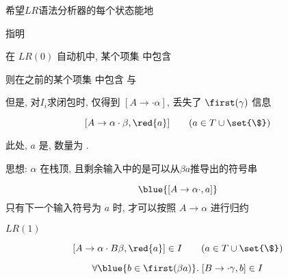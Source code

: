 \begin{frame}{}
  \begin{center}
    希望$LR$语法分析器的每个状态能地

    \vspace{0.30cm}
    指明

    \pause
    \vspace{1.00cm}
    在 $LR(0)$ 自动机中, 某个项集  中包含 

    \vspace{0.50cm}
    则在之前的某个项集  中包含 
    与 

    \vspace{0.50cm}

    \pause
    \vspace{0.80cm}
    但是, 对$I_{i}$求闭包时, 仅得到 $[A \to \cdot \alpha]$, 丢失了 $\first(\gamma)$ 信息
  \end{center}
\end{frame}

\begin{frame}{}
  \begin{center}
    \begin{definition}[$LR(1)$项 (Item)]
      \[
        [A \to \alpha \cdot \beta, \red{a}] \qquad (a \in T \cup \set{\$})
      \]

      此处, $a$ 是, 数量为 .
    \end{definition}

    \pause
    \vspace{0.80cm}
    思想: $\alpha$ 在栈顶, 且剩余输入中的是可以从$\beta a$推导出的符号串

    \pause
    \vspace{0.50cm}
    \[
      \blue{[A \to \alpha \cdot, a]}
    \]
    只有下一个输入符号为 $a$ 时, 才可以按照 $A \to \alpha$ 进行归约
  \end{center}
\end{frame}

\begin{frame}{}
  \begin{center}
    $LR(1)$

    \[
      [A \to \alpha \cdot B \beta, \red{a}] \in I \qquad (a \in T \cup \set{\$})
    \]

    \[
      \forall \blue{b \in \first(\beta a)}.\; [B \to \cdot \gamma, b] \in I
    \]
  \end{center}
\end{frame}

